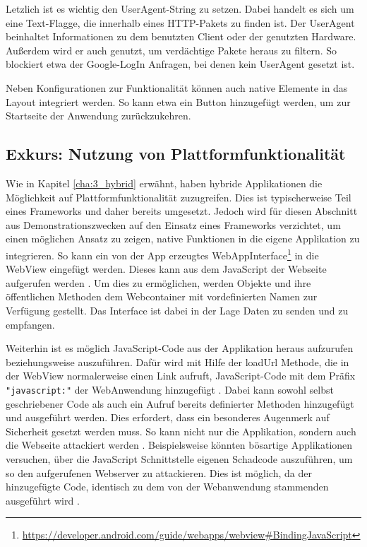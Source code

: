 Letzlich ist es wichtig den UserAgent-String zu setzen. Dabei handelt es sich um eine Text-Flagge, die innerhalb eines HTTP-Pakets zu finden ist. Der UserAgent beinhaltet Informationen zu dem benutzten Client oder der genutzten Hardware. Außerdem wird er auch genutzt, um verdächtige Pakete heraus zu filtern\cite{UserAgentString}. So blockiert etwa der Google-LogIn Anfragen, bei denen kein UserAgent gesetzt ist.

Neben Konfigurationen zur Funktionalität können auch native Elemente in das Layout integriert werden. So kann etwa ein Button hinzugefügt werden, um zur Startseite der Anwendung zurückzukehren.

\subsection{Exkurs: Nutzung von Plattformfunktionalität}
Wie in Kapitel \ref{cha:3_hybrid} erwähnt, haben hybride Applikationen die Möglichkeit auf Plattformfunktionalität zuzugreifen. 
Dies ist typischerweise Teil eines Frameworks und daher bereits umgesetzt.
Jedoch wird für diesen Abschnitt aus Demonstrationszwecken auf den Einsatz eines Frameworks verzichtet, um einen möglichen Ansatz zu zeigen, native Funktionen in die eigene Applikation zu integrieren. So kann ein von der App erzeugtes WebAppInterface\footnote{\url{https://developer.android.com/guide/webapps/webview\#BindingJavaScript}} in die WebView eingefügt werden. Dieses kann aus dem JavaScript der Webseite aufgerufen werden \cite{webview_javascript_security}. Um dies zu ermöglichen, werden Objekte und ihre öffentlichen Methoden dem Webcontainer mit vordefinierten Namen zur Verfügung gestellt. Das Interface ist dabei in der Lage Daten zu senden und zu empfangen.

Weiterhin ist es möglich JavaScript-Code aus der Applikation heraus aufzurufen beziehungsweise auszuführen. Dafür wird mit Hilfe der loadUrl Methode, die in der WebView normalerweise einen Link aufruft, JavaScript-Code mit dem Präfix \verb|"javascript:"| der WebAnwendung hinzugefügt \cite{webview_javascript_security}.
Dabei kann sowohl selbst geschriebener Code als auch ein Aufruf bereits definierter Methoden hinzugefügt und ausgeführt werden.
Dies erfordert, dass ein besonderes Augenmerk auf Sicherheit gesetzt werden muss. So kann nicht nur die Applikation, sondern auch die Webseite attackiert werden \cite{webview_javascript_security}. 
Beispielsweise könnten bösartige Applikationen versuchen, über die JavaScript Schnittstelle eigenen Schadcode auszuführen, um so den aufgerufenen Webserver zu attackieren. Dies ist möglich, da der hinzugefügte Code, identisch zu dem von der Webanwendung stammenden ausgeführt wird \cite{webview_javascript_security}.

